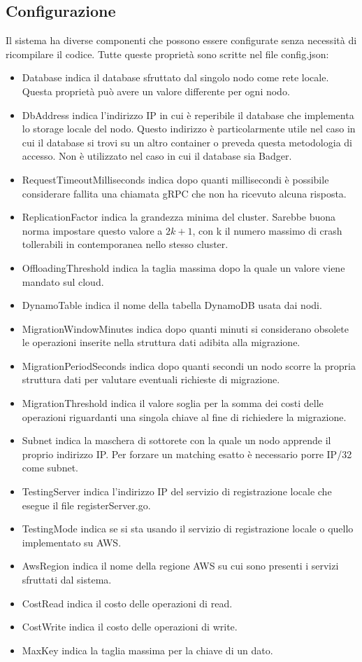 \documentclass[conference]{IEEEtran}
\begin{document}
\subsection{Configurazione}
Il sistema ha diverse componenti che possono essere configurate senza necessità di ricompilare il codice. Tutte queste
proprietà sono scritte nel file config.json:
\begin{itemize}
  \item {Database} indica il database sfruttato dal singolo nodo come rete locale. Questa proprietà può avere un valore
differente per ogni nodo.
  \item {DbAddress} indica l'indirizzo IP in cui è reperibile il database che implementa lo storage locale del nodo.
Questo indirizzo è particolarmente utile nel caso in cui il database si trovi su un altro container o preveda questa metodologia
di accesso. Non è utilizzato nel caso in cui il database sia Badger.
  \item {RequestTimeoutMilliseconds} indica dopo quanti millisecondi è possibile considerare fallita una chiamata gRPC che non
ha ricevuto alcuna risposta.
  \item {ReplicationFactor} indica la grandezza minima del cluster. Sarebbe buona norma impostare questo valore a \(2k + 1\),
con k il numero massimo di crash tollerabili in contemporanea nello stesso cluster.
  \item {OffloadingThreshold} indica la taglia massima dopo la quale un valore viene mandato sul cloud.
  \item {DynamoTable} indica il nome della tabella DynamoDB usata dai nodi.
  \item {MigrationWindowMinutes} indica dopo quanti minuti si considerano obsolete le operazioni inserite nella struttura dati
adibita alla migrazione.
  \item {MigrationPeriodSeconds} indica dopo quanti secondi un nodo scorre la propria struttura dati per valutare eventuali
richieste di migrazione.
  \item {MigrationThreshold} indica il valore soglia per la somma dei costi delle operazioni riguardanti una singola chiave
al fine di richiedere la migrazione.
  \item {Subnet} indica la maschera di sottorete con la quale un nodo apprende il proprio indirizzo IP. Per forzare un
matching esatto è necessario porre IP/32 come subnet.
  \item {TestingServer} indica l'indirizzo IP del servizio di registrazione locale che esegue il file registerServer.go.
  \item {TestingMode} indica se si sta usando il servizio di registrazione locale o quello implementato su AWS.
  \item {AwsRegion} indica il nome della regione AWS su cui sono presenti i servizi sfruttati dal sistema.
  \item {CostRead} indica il costo delle operazioni di read.
  \item {CostWrite} indica il costo delle operazioni di write.
  \item {MaxKey} indica la taglia massima per la chiave di un dato.
\end{itemize}
\end{document}
